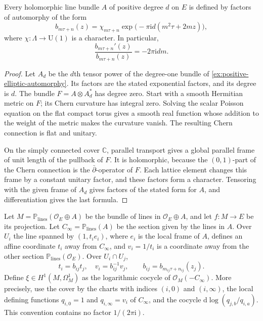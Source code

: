 \begin{lemma}\label{lem:elliptic-degree-automorphy-normalization}
Every holomorphic line bundle $A$ of positive degree $d$ on $E$ is defined by factors of automorphy of the form
\[
 b_{m\tau+n}(z)=\chi_{m\tau+n}
       \exp\bigl(-\pi\mathrm{i}d(m^2\tau+2mz)\bigr),
\]
where $\chi\colon\Lambda\to\mathrm U(1)$ is a character. In particular,
\[
 \frac{b_{m\tau+n}'(z)}{b_{m\tau+n}(z)}=-2\pi\mathrm{i}dm.
\]
\end{lemma}
\begin{proof}
Let $A_d$ be the $d$th tensor power of the degree-one bundle of \cref{ex:positive-elliptic-automorphy}. Its factors are the stated exponential factors, and its degree is $d$. The bundle $F=A\otimes A_d^*$ has degree zero. Start with a smooth Hermitian metric on $F$; its Chern curvature has integral zero. Solving the scalar Poisson equation on the flat compact torus gives a smooth real function whose addition to the weight of the metric makes the curvature vanish. The resulting Chern connection is flat and unitary.

On the simply connected cover $\mathbb C$, parallel transport gives a global parallel frame of unit length of the pullback of $F$. It is holomorphic, because the $(0,1)$-part of the Chern connection is the $\bar\partial$-operator of $F$. Each lattice element changes this frame by a constant unitary factor, and these factors form a character. Tensoring with the given frame of $A_d$ gives factors of the stated form for $A$, and differentiation gives the last formula.
\end{proof}

Let $M=\mathbb P_{\mathrm{lines}}(\mathcal O_E\oplus A)$ be the bundle of lines in $\mathcal O_E\oplus A$, and let $f\colon M\to E$ be its projection. Let $C_\infty=\mathbb P_{\mathrm{lines}}(A)$ be the section given by the lines in $A$. Over $U_i$ the line spanned by $(1,t_ie_i)$, where $e_i$ is the local frame of $A$, defines an affine coordinate $t_i$ away from $C_\infty$, and $v_i=1/t_i$ is a coordinate away from the other section $\mathbb P_{\mathrm{lines}}(\mathcal O_E)$. Over $U_i\cap U_j$,
\[
 t_i=b_{ij}t_j,\quad v_i=b_{ij}^{-1}v_j,
 \qquad b_{ij}=b_{m_{ij}\tau+n_{ij}}(z_j).
\]
Define $\xi\in H^1(M,\Omega_M^1)$ as the logarithmic cocycle of $\mathcal O_M(-C_\infty)$. More precisely, use the cover by the charts with indices $(i,0)$ and $(i,\infty)$, the local defining functions $q_{i,0}=1$ and $q_{i,\infty}=v_i$ of $C_\infty$, and the cocycle $\mathrm{d}\log(q_{j,b}/q_{i,a})$. This convention contains no factor $1/(2\pi\mathrm{i})$.

